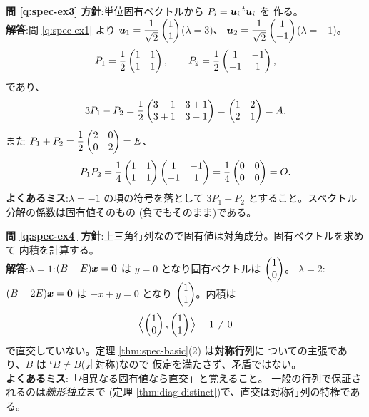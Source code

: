 \bigskip
\noindent\textbf{問 \ref{q:spec-ex3}}\quad
\textbf{方針}:単位固有ベクトルから $P_i = \bm{u}_i\,{}^t\bm{u}_i$ を
作る。\\
\textbf{解答}:問 \ref{q:spec-ex1} より
$\bm{u}_1 = \dfrac{1}{\sqrt{2}}\begin{pmatrix}1 \\ 1\end{pmatrix}$($\lambda = 3$)、
$\bm{u}_2 = \dfrac{1}{\sqrt{2}}\begin{pmatrix}1 \\ -1\end{pmatrix}$($\lambda = -1$)。
\[
P_1 = \frac{1}{2}\begin{pmatrix}1 & 1 \\ 1 & 1\end{pmatrix}, \qquad
P_2 = \frac{1}{2}\begin{pmatrix}1 & -1 \\ -1 & 1\end{pmatrix},
\]
であり、
\[
3P_1 - P_2 = \frac{1}{2}\begin{pmatrix}3 - 1 & 3 + 1 \\ 3 + 1 & 3 - 1\end{pmatrix}
= \begin{pmatrix}1 & 2 \\ 2 & 1\end{pmatrix} = A.
\]
また $P_1 + P_2 = \dfrac{1}{2}\begin{pmatrix}2 & 0 \\ 0 & 2\end{pmatrix} = E$、
\[
P_1P_2 = \frac{1}{4}\begin{pmatrix}1 & 1 \\ 1 & 1\end{pmatrix}\begin{pmatrix}1 & -1 \\ -1 & 1\end{pmatrix}
= \frac{1}{4}\begin{pmatrix}0 & 0 \\ 0 & 0\end{pmatrix} = O.
\]
\textbf{よくあるミス}:$\lambda = -1$ の項の符号を落として
$3P_1 + P_2$ とすること。スペクトル分解の係数は固有値そのもの
(負でもそのまま)である。

\bigskip
\noindent\textbf{問 \ref{q:spec-ex4}}\quad
\textbf{方針}:上三角行列なので固有値は対角成分。固有ベクトルを求めて
内積を計算する。\\
\textbf{解答}:$\lambda = 1$:$(B - E)\bm{x} = \bm{0}$ は
$y = 0$ となり固有ベクトルは $\begin{pmatrix}1 \\ 0\end{pmatrix}$。
$\lambda = 2$:$(B - 2E)\bm{x} = \bm{0}$ は $-x + y = 0$ となり
$\begin{pmatrix}1 \\ 1\end{pmatrix}$。内積は
\[
\Bigl\langle \begin{pmatrix}1 \\ 0\end{pmatrix}, \begin{pmatrix}1 \\ 1\end{pmatrix} \Bigr\rangle = 1 \neq 0
\]
で直交していない。定理 \ref{thm:spec-basic}(2) は\textbf{対称行列}に
ついての主張であり、$B$ は ${}^t\!B \neq B$(非対称)なので
仮定を満たさず、矛盾ではない。\\
\textbf{よくあるミス}:「相異なる固有値なら直交」と覚えること。
一般の行列で保証されるのは\emph{線形独立}まで
(定理 \ref{thm:diag-distinct})で、直交は対称行列の特権である。

